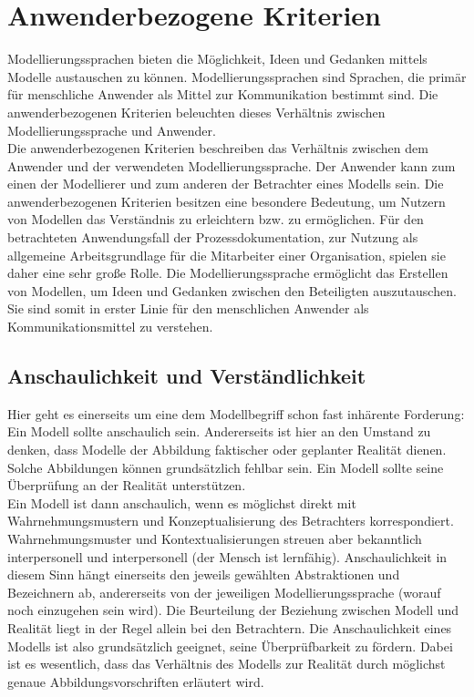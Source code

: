 \section{Anwenderbezogene Kriterien}
Modellierungssprachen bieten die Möglichkeit, Ideen und Gedanken mittels Modelle austauschen zu
können. Modellierungssprachen sind Sprachen, die primär für menschliche Anwender als Mittel zur
Kommunikation bestimmt sind. Die anwenderbezogenen Kriterien beleuchten dieses Verhältnis zwischen
Modellierungssprache und Anwender.\cite{MT010}\\
Die anwenderbezogenen Kriterien beschreiben das Verhältnis zwischen dem Anwender und der verwendeten Modellierungssprache. Der Anwender kann zum einen der Modellierer und zum anderen der Betrachter eines Modells sein. Die anwenderbezogenen Kriterien besitzen eine besondere Bedeutung, um Nutzern von Modellen das Verständnis zu erleichtern bzw. zu ermöglichen. Für den betrachteten Anwendungsfall der Prozessdokumentation, zur Nutzung als allgemeine Arbeitsgrundlage für die Mitarbeiter einer Organisation, spielen sie daher eine sehr große Rolle. Die Modellierungssprache ermöglicht das Erstellen von Modellen, um Ideen und Gedanken zwischen den Beteiligten auszutauschen. Sie sind somit in erster Linie für den menschlichen Anwender als Kommunikationsmittel zu verstehen.\cite{MT007}   
\subsection{Anschaulichkeit und Verständlichkeit}
Hier geht es einerseits um eine dem Modellbegriff schon fast inhärente Forderung: Ein Modell sollte
anschaulich sein. Andererseits ist hier an den Umstand zu denken, dass Modelle der Abbildung faktischer
oder geplanter Realität dienen. Solche Abbildungen können grundsätzlich fehlbar sein. Ein
Modell sollte seine Überprüfung an der Realität unterstützen. \\

Ein Modell ist dann anschaulich, wenn es möglichst direkt mit Wahrnehmungsmustern und Konzeptualisierung
des Betrachters korrespondiert. Wahrnehmungsmuster und Kontextualisierungen
streuen aber bekanntlich interpersonell und interpersonell (der Mensch ist lernfähig). Anschaulichkeit
in diesem Sinn hängt einerseits den jeweils gewählten Abstraktionen und Bezeichnern ab, andererseits
von der jeweiligen Modellierungssprache (worauf noch einzugehen sein wird). Die Beurteilung der
Beziehung zwischen Modell und Realität liegt in der Regel allein bei den Betrachtern. Die Anschaulichkeit
eines Modells ist also grundsätzlich geeignet, seine Überprüfbarkeit zu fördern. Dabei ist es wesentlich,
dass das Verhältnis des Modells zur Realität durch möglichst genaue Abbildungsvorschriften
erläutert wird. \cite{MT010} \\
